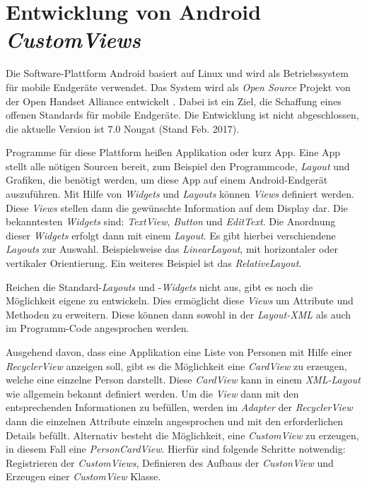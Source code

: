 \section{Entwicklung von Android \textit{CustomViews}}\label{sec:custom_view}
Die Software-Plattform Android basiert auf Linux und wird als Betriebssystem für mobile Endgeräte verwendet.
Das System wird als \textit{Open Source} Projekt von der Open Handset Alliance entwickelt \cite{open_handset_alliance}. Dabei ist ein Ziel, die Schaffung eines offenen Standards für mobile Endgeräte.
Die Entwicklung ist nicht abgeschlossen, die aktuelle Version ist 7.0 Nougat (Stand Feb. 2017).

Programme für diese Plattform heißen Applikation oder kurz App. Eine App stellt alle nötigen Sourcen bereit, zum Beispiel den Programmcode, \textit{Layout} und Grafiken, die benötigt werden, um diese App auf einem Android-Endgerät auszuführen.
Mit Hilfe von \textit{Widgets} und \textit{Layouts} können \textit{Views} definiert werden. Diese \textit{Views} stellen dann die gewünschte Information auf dem Display dar. Die bekanntesten \textit{Widgets} sind: \textit{TextView}, \textit{Button} und \textit{EditText}. Die Anordnung dieser \textit{Widgets} erfolgt dann mit einem \textit{Layout}. Es gibt hierbei verschiendene \textit{Layouts} zur Auswahl. Beispielsweise das \textit{LinearLayout}, mit horizontaler oder vertikaler Orientierung. Ein weiteres Beispiel ist das \textit{RelativeLayout}.

Reichen die Standard-\textit{Layouts} und -\textit{Widgets} nicht aus, gibt es noch die Möglichkeit eigene zu entwickeln. Dies ermöglicht diese \textit{Views} um Attribute und Methoden zu erweitern. Diese können dann sowohl in der \textit{Layout-XML} als auch im Programm-Code angesprochen werden.

Ausgehend davon, dass eine Applikation eine Liste von Personen mit Hilfe einer \textit{RecyclerView} anzeigen soll, gibt es die Möglichkeit eine \textit{CardView} zu erzeugen, welche eine einzelne Person darstellt. Diese \textit{CardView} kann in einem \textit{XML-Layout} wie allgemein bekannt definiert werden. Um die \textit{View} dann mit den entsprechenden Informationen zu befüllen, werden im \textit{Adapter} der \textit{RecyclerView} dann die einzelnen Attribute einzeln angesprochen und mit den erforderlichen Details befüllt.
Alternativ besteht die Möglichkeit, eine \textit{CustomView} zu erzeugen, in diesem Fall eine \textit{PersonCardView}.
Hierfür sind folgende Schritte notwendig: Registrieren der \textit{CustomViews}, Definieren des Aufbaus der \textit{CustonView} und Erzeugen einer \textit{CustomView} Klasse.

